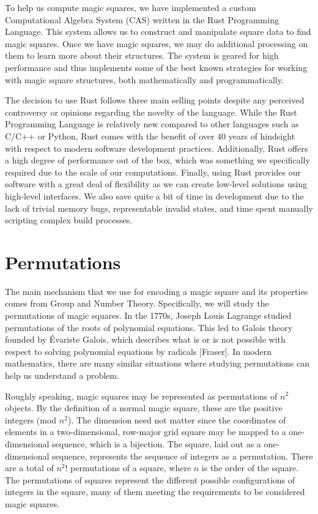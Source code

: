 \documentclass[12pt]{report}
\begin{document}
\par To help us compute magic squares, we have implemented a custom Computational Algebra System
(CAS) written in the Rust Programming Language. This system allows us to construct and manipulate
square data to find magic squares. Once we have magic squares, we may do additional processing on
them to learn more about their structures. The system is geared for high performance and thus
implements some of the best known strategies for working with magic square structures, both
mathematically and programmatically.

\par The decision to use Rust follows three main selling points despite any perceived controversy
or opinions regarding the novelty of the language. While the Rust Programming Language is
relatively new compared to other languages such as C/C++ or Python, Rust comes with the benefit of
over 40 years of hindsight with respect to modern software development practices. Additionally,
Rust offers a high degree of performance out of the box, which was something we specifically
required due to the scale of our computations. Finally, using Rust provides our software with a
great deal of flexibility as we can create low-level solutions using high-level interfaces. We also
save quite a bit of time in development due to the lack of trivial memory bugs, representable
invalid states, and time spent manually scripting complex build processes.

\section{Permutations}

\par The main mechanism that we use for encoding a magic square and its properties comes from Group
and Number Theory. Specifically, we will study the permutations of magic squares. In the 1770s,
Joseph Louis Lagrange studied permutations of the roots of polynomial equations. This led to Galois
theory founded by Évariste Galois, which describes what is or is not possible with respect to
solving polynomial equations by radicals [Fraser]. In modern mathematics, there are many similar
situations where studying permutations can help us understand a problem.

\par Roughly speaking, magic squares may be represented as permutations of $n^2$ objects. By the
definition of a normal magic square, these are the positive integers (mod $n^2$). The dimension
need not matter since the coordinates of elements in a two-dimensional, row-major grid square may
be mapped to a one-dimensional sequence, which is a bijection. The square, laid out as a
one-dimensional sequence, represents the sequence of integers as a permutation. There are a total
of $n^{2}$! permutations of a square, where $n$ is the order of the square. The permutations of
squares represent the different possible configurations of integers in the square, many of them
meeting the requirements to be considered magic squares.
\end{document}
